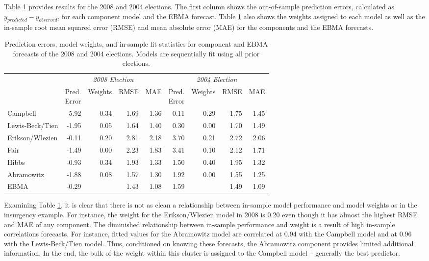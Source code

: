 \documentclass[pdftex,12pt,fullpage,oneside]{amsart}
\begin{document}
Table \ref{Pres-Year-Res} provides results for the 2008 and 2004
elections.  The first column shows the out-of-sample prediction
errors, calculated as $y_{predicted}-y_{observed}$, for each component
model and the EBMA forecast.  Table \ref{Pres-Year-Res} also shows the
weights assigned to each model as well as the in-sample root mean
squared error (RMSE) and mean absolute error (MAE) for the components
and the EBMA forecasts. 

\begin{table}[ht!]
\caption{\footnotesize Prediction errors, model weights, and in-sample fit
  statistics for component and EBMA forecasts of the 2008 and 2004
  elections.  Models are sequentially fit using all prior elections.}
\label{Pres-Year-Res} \small
\begin{tabular}{l | rrrr||rrrr}	
\toprule
 &\multicolumn{4}{c}{\textit{2008 Election}}  &\multicolumn{4}{c}{\textit{2004 Election}} \\ 
&\shortstack{Pred. \\ Error} &	Weights&	RMSE &MAE & \shortstack{Pred.\\  Error} &Weights&	RMSE&	MAE\\
\midrule
Campbell &	5.92&	0.34	&1.69&	1.36	&	0.11&	0.29&1.75&	1.45\\
Lewis-Beck/Tien&	-1.95&	0.05	&1.64&	1.40	&	0.30	&0.00&	1.70	&1.49\\
Erikson/Wlezien&	-0.11&	0.20&	2.81& 	2.18	&	3.70	&0.21	&2.72&	2.06\\
Fair&	-1.49&	0.00	&2.23&	1.83	&	3.41&	0.10&	2.12& 1.71\\
Hibbs &	-0.93&	0.34	&1.93&	1.33	&	1.50&	0.40	&1.95	&1.32\\
Abramowitz&	-1.88&	0.08	&1.57&	1.30	&	1.92&	0.00	&1.55	&1.25\\
EBMA&	-0.29&	&1.43&	1.08	&	1.59	&	&1.49& 1.09\\
\bottomrule
\end{tabular}
\end{table}



Examining Table \ref{Pres-Year-Res}, it is clear that there is not as
clean a relationship between in-sample model performance and model
weights as in the insurgency example.  For instance, the weight for
the Erikson/Wlezien model in 2008 is 0.20 even though it has almost
the highest RMSE and MAE of any component.  The diminished
relationship between in-sample performance and weight is a result of
high in-sample correlations forecasts. For instance, fitted values for
the Abramowitz model are correlated at 0.94 with the Campbell model
and at 0.96 with the Lewis-Beck/Tien model.  Thus, conditioned on
knowing these forecasts, the Abramowitz component provides limited
additional information.  In the end, the bulk of the weight within
this cluster is assigned to the Campbell model -- generally the best
predictor.
\end{document}
